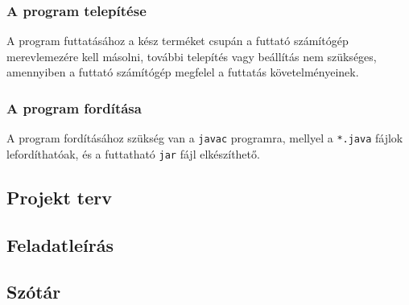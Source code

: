     \subsubsection{A program telepítése}
A program futtatásához a kész terméket csupán a futtató számítógép merevlemezére kell másolni, további telepítés vagy beállítás nem szükséges, amennyiben a futtató számítógép megfelel a futtatás követelményeinek.

    \subsubsection{A program fordítása}
A program fordításához szükség van a \texttt{javac} programra, mellyel a \texttt{*.java} fájlok lefordíthatóak, és a futtatható \texttt{jar} fájl elkészíthető.
    
\subsection{Projekt terv}
\subsection{Feladatleírás}
\subsection{Szótár}


